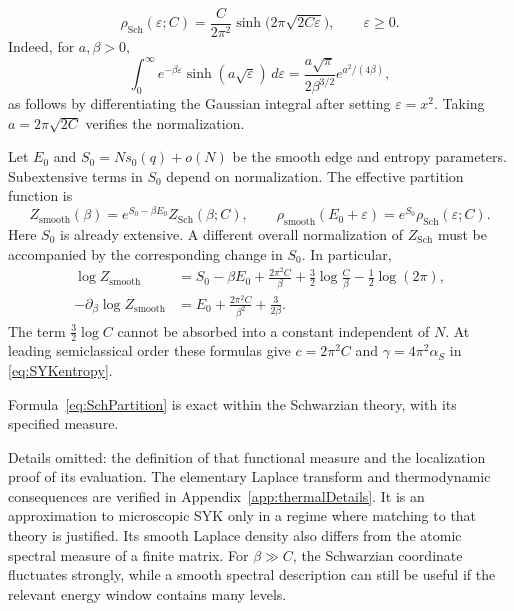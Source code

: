 \documentclass[11pt]{article}
\numberwithin{equation}{section}
\theoremstyle{exposition}
\theoremstyle{result}
\newcommand{\Sch}{\mathrm{Sch}}
\begin{document}
\begin{equation}
\rho_{\Sch}(\varepsilon;C)
=\frac{C}{2\pi^2}\sinh\bigl(2\pi\sqrt{2C\varepsilon}\bigr),
\qquad \varepsilon\geq0.
\label{eq:SchDensity}
\end{equation}
Indeed, for $a,\beta>0$,
\begin{equation*}
\int_0^\infty e^{-\beta\varepsilon}\sinh(a\sqrt\varepsilon)\,d\varepsilon
=\frac{a\sqrt\pi}{2\beta^{3/2}}e^{a^2/(4\beta)},
\end{equation*}
as follows by differentiating the Gaussian integral after setting $\varepsilon=x^2$. Taking $a=2\pi\sqrt{2C}$ verifies the normalization.

Let $E_0$ and $S_0=Ns_0(q)+o(N)$ be the smooth edge and entropy parameters. Subextensive terms in $S_0$ depend on normalization. The effective partition function is
\begin{equation}
Z_{\mathrm{smooth}}(\beta)
=e^{S_0-\beta E_0}Z_{\Sch}(\beta;C),
\qquad
\rho_{\mathrm{smooth}}(E_0+\varepsilon)
=e^{S_0}\rho_{\Sch}(\varepsilon;C).
\label{eq:SchMatching}
\end{equation}
Here $S_0$ is already extensive. A different overall normalization of $Z_{\Sch}$ must be accompanied by the corresponding change in $S_0$. In particular,
\begin{align*}
\log Z_{\mathrm{smooth}}
&=S_0-\beta E_0+\frac{2\pi^2C}{\beta}
+\frac32\log\frac C\beta-\frac12\log(2\pi),\\
-\partial_\beta\log Z_{\mathrm{smooth}}
&=E_0+\frac{2\pi^2C}{\beta^2}+\frac{3}{2\beta}.
\end{align*}
The term $\tfrac32\log C$ cannot be absorbed into a constant independent of $N$. At leading semiclassical order these formulas give $c=2\pi^2C$ and $\gamma=4\pi^2\alpha_S$ in \eqref{eq:SYKentropy}.

Formula~\eqref{eq:SchPartition} is exact within the Schwarzian theory, with its specified measure.

Details omitted: the definition of that functional measure and the localization proof of its evaluation. The elementary Laplace transform and thermodynamic consequences are verified in Appendix~\ref{app:thermalDetails}. It is an approximation to microscopic SYK only in a regime where matching to that theory is justified. Its smooth Laplace density also differs from the atomic spectral measure of a finite matrix. For $\beta\gg C$, the Schwarzian coordinate fluctuates strongly, while a smooth spectral description can still be useful if the relevant energy window contains many levels.
\end{document}

